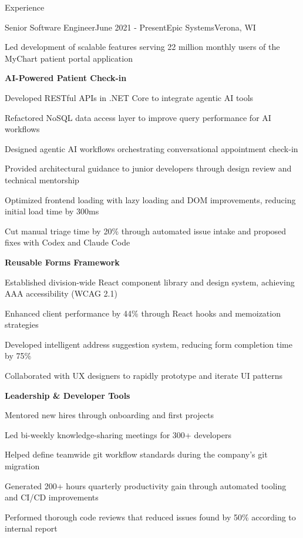 \documentclass[
	10pt, %
]{article} %
\begin{document}
\begin{rSection}{Experience}

	\begin{rSubsection}{Senior Software Engineer}{June 2021 - Present}{Epic Systems}{Verona, WI}
		\item[] Led development of scalable features serving 22 million monthly users of the MyChart patient portal application
		\item[--] \textbf{AI-Powered Patient Check-in}
		\item Developed RESTful APIs in .NET Core to integrate agentic AI tools
		\item Refactored NoSQL data access layer to improve query performance for AI workflows
		\item Designed agentic AI workflows orchestrating conversational appointment check-in
		\item Provided architectural guidance to junior developers through design review and technical mentorship
		\item Optimized frontend loading with lazy loading and DOM improvements, reducing initial load time by 300ms
		\item Cut manual triage time by 20\% through automated issue intake and proposed fixes with Codex and Claude Code
		\item[--] \textbf{Reusable Forms Framework}
		\item Established division-wide React component library and design system, achieving AAA accessibility (WCAG 2.1)
		\item Enhanced client performance by 44\% through React hooks and memoization strategies
		\item Developed intelligent address suggestion system, reducing form completion time by 75\%
		\item Collaborated with UX designers to rapidly prototype and iterate UI patterns
		\item[--] \textbf{Leadership \& Developer Tools}
		\item Mentored new hires through onboarding and first projects
		\item Led bi-weekly knowledge-sharing meetings for 300+ developers
		\item Helped define teamwide git workflow standards during the company's git migration
		\item Generated 200+ hours quarterly productivity gain through automated tooling and CI/CD improvements
		\item Performed thorough code reviews that reduced issues found by 50\% according to internal report
	\end{rSubsection}


\end{rSection}
\end{document}
